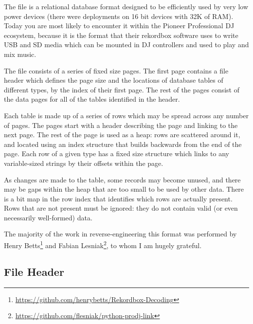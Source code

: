 \documentclass[11pt]{article}
\begin{document}
The file is a relational database format designed to be efficiently
used by very low power devices (there were deployments on 16 bit
devices with 32K of RAM). Today you are most likely to encounter it
within the Pioneer Professional DJ ecosystem, because it is the format
that their rekordbox software uses to write USB and SD media which can
be mounted in DJ controllers and used to play and mix music.

The file consists of a series of fixed size pages. The first page
contains a file header which defines the page size and the locations
of database tables of different types, by the index of their first
page. The rest of the pages consist of the data pages for all of the
tables identified in the header.

Each table is made up of a series of rows which may be spread across
any number of pages. The pages start with a header describing the page
and linking to the next page. The rest of the page is used as a heap:
rows are scattered around it, and located using an index structure
that builds backwards from the end of the page. Each row of a given
type has a fixed size structure which links to any variable-sized
strings by their offsets within the page.

As changes are made to the table, some records may become unused, and
there may be gaps within the heap that are too small to be used by
other data. There is a bit map in the row index that identifies which
rows are actually present. Rows that are not present must be ignored:
they do not contain valid (or even necessarily well-formed) data.

The majority of the work in reverse-engineering this format was
performed by Henry
Betts\footnote{\url{https://github.com/henrybetts/Rekordbox-Decoding}}
and Fabian
Lesniak\footnote{\url{https://github.com/flesniak/python-prodj-link}},
to whom I am hugely grateful.

\subsection{File Header}
\label{sec:fileHeader}
\end{document}

